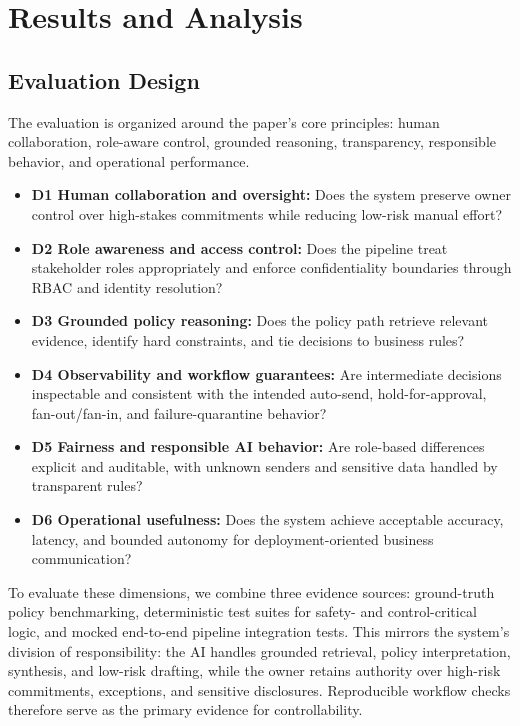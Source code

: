 \documentclass[11pt]{article}
\begin{document}
\section{Results and Analysis}
\subsection{Evaluation Design}

The evaluation is organized around the paper's core principles: human collaboration, role-aware control, grounded reasoning, transparency, responsible behavior, and operational performance.

\begin{itemize}
\item \textbf{D1 Human collaboration and oversight:} Does the system preserve owner control over high-stakes commitments while reducing low-risk manual effort?
\item \textbf{D2 Role awareness and access control:} Does the pipeline treat stakeholder roles appropriately and enforce confidentiality boundaries through RBAC and identity resolution?
\item \textbf{D3 Grounded policy reasoning:} Does the policy path retrieve relevant evidence, identify hard constraints, and tie decisions to business rules?
\item \textbf{D4 Observability and workflow guarantees:} Are intermediate decisions inspectable and consistent with the intended auto-send, hold-for-approval, fan-out/fan-in, and failure-quarantine behavior?
\item \textbf{D5 Fairness and responsible AI behavior:} Are role-based differences explicit and auditable, with unknown senders and sensitive data handled by transparent rules?
\item \textbf{D6 Operational usefulness:} Does the system achieve acceptable accuracy, latency, and bounded autonomy for deployment-oriented business communication?
\end{itemize}

To evaluate these dimensions, we combine three evidence sources: ground-truth policy benchmarking, deterministic test suites for safety- and control-critical logic, and mocked end-to-end pipeline integration tests. This mirrors the system's division of responsibility: the AI handles grounded retrieval, policy interpretation, synthesis, and low-risk drafting, while the owner retains authority over high-risk commitments, exceptions, and sensitive disclosures. Reproducible workflow checks therefore serve as the primary evidence for controllability.
\end{document}
